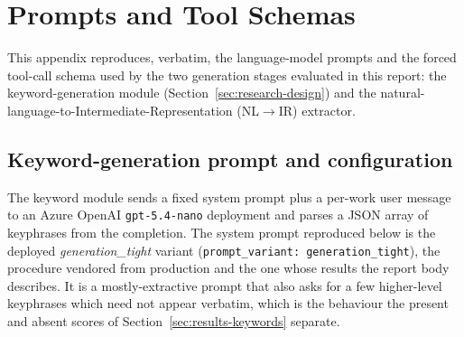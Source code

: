 \section{Prompts and Tool Schemas}
\label{app:prompts}

This appendix reproduces, verbatim, the language-model prompts and the forced
tool-call schema used by the two generation stages evaluated in this report: the
keyword-generation module (Section~\ref{sec:research-design}) and the
natural-language-to-Intermediate-Representation (NL$\rightarrow$IR) extractor.

\subsection*{Keyword-generation prompt and configuration}

The keyword module sends a fixed system prompt plus a per-work user message to an
Azure OpenAI \texttt{gpt-5.4-nano} deployment and parses a JSON array of
keyphrases from the completion. The system prompt reproduced below is the deployed
\emph{generation\_tight} variant (\lstinline|prompt_variant: generation_tight|),
the procedure vendored from production and the one whose results the report body
describes. It is a mostly-extractive prompt that also asks for a few higher-level
keyphrases which need not appear verbatim, which is the behaviour the present and
absent scores of Section~\ref{sec:results-keywords} separate.


